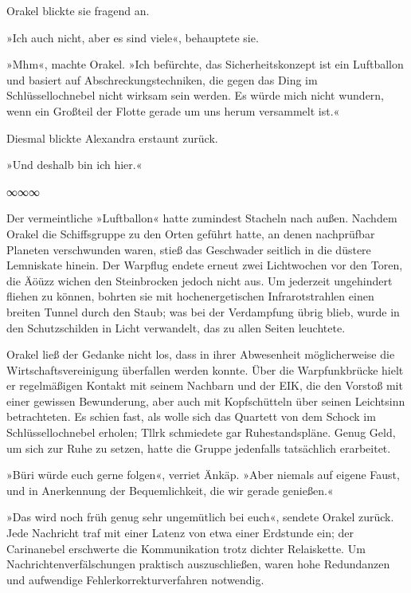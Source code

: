 Orakel blickte sie fragend an.

»Ich auch nicht, aber es sind viele«, behauptete sie.

»Mhm«, machte Orakel. »Ich befürchte, das Sicherheitskonzept ist ein Luftballon und basiert auf Abschreckungstechniken, die gegen das Ding im Schlüssellochnebel nicht wirksam sein werden. Es würde mich nicht wundern, wenn ein Großteil der Flotte gerade um uns herum versammelt ist.«

Diesmal blickte Alexandra erstaunt zurück.

»Und deshalb bin ich hier.«

\begin{center}
∞∞∞
\end{center}

Der vermeintliche »Luftballon« hatte zumindest Stacheln nach außen. Nachdem Orakel die Schiffsgruppe zu den Orten geführt hatte, an denen nachprüfbar Planeten verschwunden waren, stieß das Geschwader seitlich in die düstere Lemniskate hinein. Der Warpflug endete erneut zwei Lichtwochen vor den Toren, die Äöüzz wichen den Steinbrocken jedoch nicht aus. Um jederzeit ungehindert fliehen zu können, bohrten sie mit hochenergetischen Infrarotstrahlen einen breiten Tunnel durch den Staub; was bei der Verdampfung übrig blieb, wurde in den Schutzschilden in Licht verwandelt, das zu allen Seiten leuchtete.

Orakel ließ der Gedanke nicht los, dass in ihrer Abwesenheit möglicherweise die Wirtschaftsvereinigung überfallen werden konnte. Über die Warpfunkbrücke hielt er regelmäßigen Kontakt mit seinem Nachbarn und der EIK, die den Vorstoß mit einer gewissen Bewunderung, aber auch mit Kopfschütteln über seinen Leichtsinn betrachteten. Es schien fast, als wolle sich das Quartett von dem Schock im Schlüssellochnebel erholen; Tllrk schmiedete gar Ruhestandspläne. Genug Geld, um sich zur Ruhe zu setzen, hatte die Gruppe jedenfalls tatsächlich erarbeitet.

»Büri würde euch gerne folgen«, verriet Änkäp. »Aber niemals auf eigene Faust, und in Anerkennung der Bequemlichkeit, die wir gerade genießen.«

»Das wird noch früh genug sehr ungemütlich bei euch«, sendete Orakel zurück. Jede Nachricht traf mit einer Latenz von etwa einer Erdstunde ein; der Carinanebel erschwerte die Kommunikation trotz dichter Relaiskette. Um Nachrichtenverfälschungen praktisch auszuschließen, waren hohe Redundanzen und aufwendige Fehlerkorrekturverfahren notwendig.

